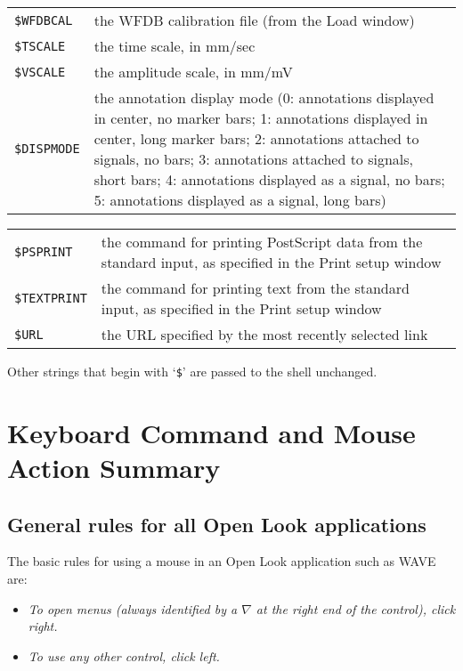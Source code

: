 \documentclass[twoside]{book}
\newcommand{\WAVE}{{\sf WAVE}\xspace}
\begin{document}
\begin{tabular*}{\textwidth}{l p{3.5 in}}
{\tt \$WFDBCAL} &
{ the WFDB calibration file (from the {\sf Load} window) } \\

{\tt \$TSCALE} & { the time scale, in mm/sec } \\

{\tt \$VSCALE} & { the amplitude scale, in mm/mV } \\

{\tt \$DISPMODE} &
{ the annotation display mode (0: annotations displayed in center,
no marker bars; 1: annotations displayed in center, long marker bars;
2: annotations attached to signals, no bars; 3: annotations attached
to signals, short bars; 4: annotations displayed as a signal, no bars;
5: annotations displayed as a signal, long bars) } \\
\end{tabular*}

\begin{tabular*}{\textwidth}{l p{3.5 in}}
{\tt \$PSPRINT} &
{ the command for printing PostScript data from the standard input,
as specified in the {\sf Print setup} window } \\

{\tt \$TEXTPRINT} &
{ the command for printing text from the standard input,
as specified in the {\sf Print setup} window } \\

{\tt \$URL} &
{ the URL specified by the most recently selected link }
\end{tabular*}

\vspace{.5cm}
Other strings that begin with `{\tt \$}' are passed to the shell unchanged.

\chapter{Keyboard Command and Mouse Action Summary}

\section{General rules for all Open Look applications}

The basic rules for using a mouse in an Open Look application such as \WAVE{}
are:

\begin{itemize}
\item
\emph{To open menus (always identified by a $\nabla$ at the right end of the
control), click right.}

\item
\emph{To use any other control, click left.}
\end{itemize}
\end{document}
